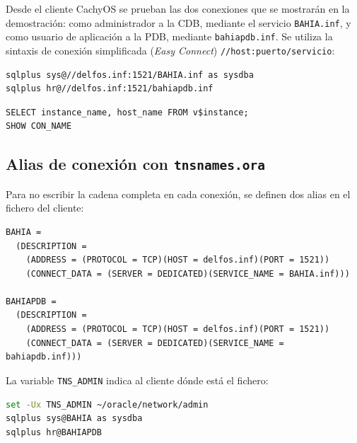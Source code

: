 Desde el cliente CachyOS se prueban las dos conexiones que se mostrarán en la demostración: como administrador a la CDB, mediante el servicio \texttt{BAHIA.inf}, y como usuario de aplicación a la PDB, mediante \texttt{bahiapdb.inf}. Se utiliza la sintaxis de conexión simplificada (\textit{Easy Connect}) \texttt{//host:puerto/servicio}:

\begin{lstlisting}[language=bash]
sqlplus sys@//delfos.inf:1521/BAHIA.inf as sysdba
sqlplus hr@//delfos.inf:1521/bahiapdb.inf
\end{lstlisting}

\begin{lstlisting}[style=sql]
SELECT instance_name, host_name FROM v$instance;
SHOW CON_NAME
\end{lstlisting}


\subsection{Alias de conexión con \texttt{tnsnames.ora}}

Para no escribir la cadena completa en cada conexión, se definen dos alias en el fichero  del cliente:

\begin{lstlisting}
BAHIA =
  (DESCRIPTION =
    (ADDRESS = (PROTOCOL = TCP)(HOST = delfos.inf)(PORT = 1521))
    (CONNECT_DATA = (SERVER = DEDICATED)(SERVICE_NAME = BAHIA.inf)))

BAHIAPDB =
  (DESCRIPTION =
    (ADDRESS = (PROTOCOL = TCP)(HOST = delfos.inf)(PORT = 1521))
    (CONNECT_DATA = (SERVER = DEDICATED)(SERVICE_NAME = bahiapdb.inf)))
\end{lstlisting}

La variable \texttt{TNS\_ADMIN} indica al cliente dónde está el fichero:

\begin{lstlisting}[language=bash]
set -Ux TNS_ADMIN ~/oracle/network/admin
sqlplus sys@BAHIA as sysdba
sqlplus hr@BAHIAPDB
\end{lstlisting}



